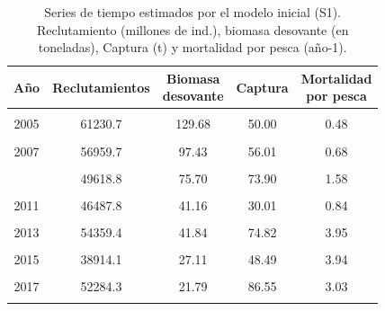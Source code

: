 \documentclass[
]{article}
\begin{document}
\begin{table}[ht!]
\centering\centering
\caption{\label{tab:unnamed-chunk-11}\label{Tab4}Series de tiempo estimados por el modelo inicial (S1). Reclutamiento (millones de ind.),  biomasa desovante (en toneladas), Captura (t) y mortalidad por pesca (año-1).}
\centering
\fontsize{9}{11}\selectfont
\begin{tabular}[t]{ccccc}
\toprule
Año & Reclutamientos & \makecell[c]{Biomasa\\desovante} & Captura & \makecell[c]{Mortalidad\\por pesca}\\
\midrule
\cellcolor{gray!10}{2004} & \cellcolor{gray!10}{62296.6} & \cellcolor{gray!10}{131.49} & \cellcolor{gray!10}{23.00} & \cellcolor{gray!10}{0.19}\\
2005 & 61230.7 & 129.68 & 50.00 & 0.48\\
\cellcolor{gray!10}{2006} & \cellcolor{gray!10}{59486.4} & \cellcolor{gray!10}{116.10} & \cellcolor{gray!10}{38.00} & \cellcolor{gray!10}{0.41}\\
2007 & 56959.7 & 97.43 & 56.01 & 0.68\\
\cellcolor{gray!10}{2008} & \cellcolor{gray!10}{53952.3} & \cellcolor{gray!10}{91.39} & \cellcolor{gray!10}{70.11} & \cellcolor{gray!10}{1.09}\\
\addlinespace
2009 & 49618.8 & 75.70 & 73.90 & 1.58\\
\cellcolor{gray!10}{2010} & \cellcolor{gray!10}{46620.0} & \cellcolor{gray!10}{57.28} & \cellcolor{gray!10}{80.40} & \cellcolor{gray!10}{2.65}\\
2011 & 46487.8 & 41.16 & 30.01 & 0.84\\
\cellcolor{gray!10}{2012} & \cellcolor{gray!10}{47197.6} & \cellcolor{gray!10}{33.12} & \cellcolor{gray!10}{85.27} & \cellcolor{gray!10}{2.95}\\
2013 & 54359.4 & 41.84 & 74.82 & 3.95\\
\addlinespace
\cellcolor{gray!10}{2014} & \cellcolor{gray!10}{31108.3} & \cellcolor{gray!10}{26.72} & \cellcolor{gray!10}{80.63} & \cellcolor{gray!10}{4.00}\\
2015 & 38914.1 & 27.11 & 48.49 & 3.94\\
\cellcolor{gray!10}{2016} & \cellcolor{gray!10}{58124.2} & \cellcolor{gray!10}{17.08} & \cellcolor{gray!10}{34.99} & \cellcolor{gray!10}{1.57}\\
2017 & 52284.3 & 21.79 & 86.55 & 3.03\\
\cellcolor{gray!10}{2018} & \cellcolor{gray!10}{119431.0} & \cellcolor{gray!10}{37.18} & \cellcolor{gray!10}{72.14} & \cellcolor{gray!10}{2.85}\\

\end{tabular}
\end{table}
\end{document}
